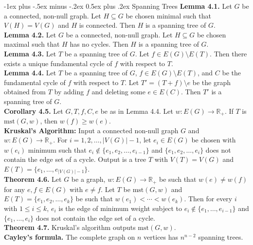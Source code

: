 \documentclass[10pt,landscape]{article}
\makeatletter
\renewcommand{\section}{\@startsection{section}{1}{0mm}%
                                {-1ex plus -.5ex minus -.2ex}%
                                {0.5ex plus .2ex}%
                                {\normalfont\large\bfseries}}
\makeatother
\begin{document}
\begin{multicols}{3}
\section{Spanning Trees}
\textbf{Lemma 4.1.} Let \( G \) be a connected, non-null graph. Let \( H \subseteq G \) be chosen minimal such that \( V(H) = V(G) \) and \( H \) is connected. Then \( H \) is a spanning tree of \( G \). \\
\textbf{Lemma 4.2.} Let \( G \) be a connected, non-null graph. Let \( H \subseteq G	\) be chosen maximal such that \( H \) has no cycles. Then \( H \) is a spanning tree of \( G \). \\
\textbf{Lemma 4.3.} Let \( T \) be a spanning tree of \( G \). Let \( f \in E(G) \setminus E(T) \). Then there exists a unique fundamental cycle of \( f \) with respect to \( T \). \\
\textbf{Lemma 4.4.} Let \( T \) be a spanning tree of \( G \), \( f \in E(G) \setminus E(T) \), and \( C \) be the fundamental cycle of \( f \) with respect to \( T \). Let \( T' = (T+f) \setminus e \) be the graph obtained from \( T \) by adding \( f \) and deleting some \( e \in E(C). \) Then \( T' \) is a spanning tree of \( G \). \\
\textbf{Corollary 4.5.} Let \( G,T,f,C,e \) be as in Lemma 4.4. Let \( w : E(G) \to \mathbb{R}_+ \). If \( T \) is \( \mbox{mst}(G,w) \), then \( w(f) \geq w(e). \) \\
\textbf{Kruskal's Algorithm:} Input a connected non-null graph \( G \) and \( w : E(G) \to \mathbb{R}_{+}  \). For \( i = 1, 2, \hdots , |V(G)| - 1 \), let \( e_{i} \in E(G) \) be chosen with \( w(e_{i} ) \) minimum such that \( e_{i} \notin \{ e_1, e_2, \hdots , e_{i  -   1}  \}  \) and \( \{ e_1, e_2, \hdots , e_{i}  \}  \) does not contain the edge set of a cycle. Output is a tree \( T \) with \( V(T) = V(G) \) and \( E(T) = \{ e_1, \hdots , e_{|V(G)| - 1}  \}  \). \\
\textbf{Theorem 4.6.} Let \( G \) be a graph, \( w :E(G) \to \mathbb{R}_+ \) be such that \( w(e) \neq w(f) \) for any \( e,f \in E(G) \) with \( e \neq f \). Let \( T \) be \( \mbox{mst}(G,w) \) and \( E(T) = \{ e_1,e_2,\hdots ,e_k \}  \) be such that \( w(e_1) < \cdots < w(e_k) \). Then for every \( i \) with \( 1 \leq i \leq k \), \( e_i \) is the edge of minimum weight subject to \( e_i \notin \{ e_1, \hdots , e_{i-1}  \}  \) and \( \{ e_1, \hdots , e_i \} \) does not contain the edge set of a cycle. \\
\textbf{Theorem 4.7.} Kruskal's algorithm outputs \( \mbox{mst}(G,w) \). \\
\textbf{Cayley's formula.} The complete graph on \( n \) vertices has \( n^{n-2}  \) spanning trees. 

\end{multicols}
\end{document}
